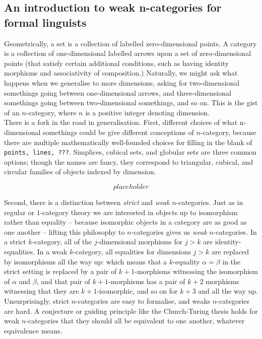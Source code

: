 \begin{fullwidth}
\section{An introduction to weak n-categories for formal linguists}

Geometrically, a set is a collection of labelled zero-dimensional points. A category is a collection of one-dimensional labelled arrows upon a set of zero-dimensional points (that satisfy certain additional conditions, such as having identity morphisms and associativity of composition.) Naturally, we might ask what happens when we generalise to more dimensions, asking for two-dimensional somethings going between one-dimensional arrows, and three-dimensional somethings going between two-dimensional somethings, and so on. This is the gist of an $n$-category, where $n$ is a positive integer denoting dimension.\\

There is a fork in the road in generalisation. First, different choices of what n-dimensional somethings could be give different conceptions of $n$-category, because there are multiple mathematically well-founded choices for filling in the blank of \texttt{points, lines, ???}. Simplices, cubical sets, and globular sets are three common options; though the names are fancy, they correspond to triangular, cubical, and circular families of objects indexed by dimension.

\[placeholder\]

Second, there is a distinction between \emph{strict} and \emph{weak} $n$-categories. Just as in regular or $1$-category theory we are interested in objects up to isomorphism rather than equality -- because isomorphic objects in a category are as good as one another -- lifting this philosophy to $n$-categories gives us \emph{weak} $n$-categories. In a strict $k$-category, all of the $j$-dimensional morphisms for $j > k$ are identity-equalities. In a weak $k$-category, all equalities for dimensions $j > k$ are replaced by isomorphisms all the way up: which means that a $k$-equality $\alpha = \beta$ in the strict setting is replaced by a pair of $k+1$-morphisms witnessing the isomorphism of $\alpha$ and $\beta$, and that pair of $k+1$-morphisms has a pair of $k+2$ morphisms witnessing that they are $k+1$-isomorphic, and so on for $k+3$ and all the way up. Unsurprisingly, strict $n$-categories are easy to formalise, and weaks $n$-categories are hard. A conjecture or guiding principle like the Church-Turing thesis holds for weak $n$-categories that they should all be equivalent to one another, whatever equivalence means.\\


\end{fullwidth}
